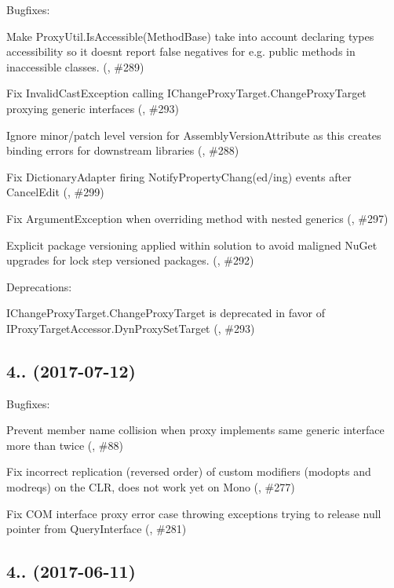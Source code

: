 Bugfixes\+:
\begin{DoxyItemize}
\item Make Proxy\+Util.\+Is\+Accessible(\+Method\+Base) take into account declaring type\textquotesingle{}s accessibility so it doesn\textquotesingle{}t report false negatives for e.\+g. public methods in inaccessible classes. (, \#289)
\item Fix Invalid\+Cast\+Exception calling I\+Change\+Proxy\+Target.\+Change\+Proxy\+Target proxying generic interfaces (, \#293)
\item Ignore minor/patch level version for Assembly\+Version\+Attribute as this creates binding errors for downstream libraries (, \#288)
\item Fix Dictionary\+Adapter firing Notify\+Property\+Chang(ed/ing) events after Cancel\+Edit (, \#299)
\item Fix Argument\+Exception when overriding method with nested generics (, \#297)
\item Explicit package versioning applied within solution to avoid maligned Nu\+Get upgrades for lock step versioned packages. (, \#292)
\end{DoxyItemize}

Deprecations\+:
\begin{DoxyItemize}
\item I\+Change\+Proxy\+Target.\+Change\+Proxy\+Target is deprecated in favor of I\+Proxy\+Target\+Accessor.\+Dyn\+Proxy\+Set\+Target (, \#293)
\end{DoxyItemize}

\subsection*{4.. (2017-\/07-\/12)}

Bugfixes\+:
\begin{DoxyItemize}
\item Prevent member name collision when proxy implements same generic interface more than twice (, \#88)
\item Fix incorrect replication (reversed order) of custom modifiers (modopts and modreqs) on the C\+LR, does not work yet on Mono (, \#277)
\item Fix C\+OM interface proxy error case throwing exceptions trying to release null pointer from Query\+Interface (, \#281)
\end{DoxyItemize}

\subsection*{4.. (2017-\/06-\/11)}

